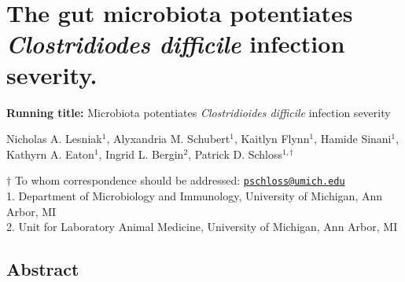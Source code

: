 \documentclass[
  12pt,
]{article}
\author{}
\date{\vspace{-2.5em}}
\begin{document}
\linenumbers
\doublespacing

\hypertarget{the-gut-microbiota-potentiates-clostridiodes-difficile-infection-severity.}{%
\section{\texorpdfstring{The gut microbiota potentiates
\emph{Clostridiodes difficile} infection
severity.}{The gut microbiota potentiates Clostridiodes difficile infection severity.}}\label{the-gut-microbiota-potentiates-clostridiodes-difficile-infection-severity.}}

\vspace{30mm}

\textbf{Running title:} Microbiota potentiates \emph{Clostridioides
difficile} infection severity

\vspace{20mm}

Nicholas A. Lesniak\(^1\), Alyxandria M. Schubert\(^1\), Kaitlyn
Flynn\(^1\), Hamide Sinani\(^1\), Kathyrn A. Eaton\(^1\), Ingrid L.
Bergin\(^2\), Patrick D. Schloss\(^{1,\dagger}\)

\vspace{30mm}

\(\dagger\) To whom correspondence should be addressed:
\href{mailto:pschloss@umich.edu}{\nolinkurl{pschloss@umich.edu}}\\
1. Department of Microbiology and Immunology, University of Michigan,
Ann Arbor, MI\\
2. Unit for Laboratory Animal Medicine, University of Michigan, Ann
Arbor, MI

\newpage

\hypertarget{abstract}{%
\subsection{Abstract}\label{abstract}}
\end{document}

